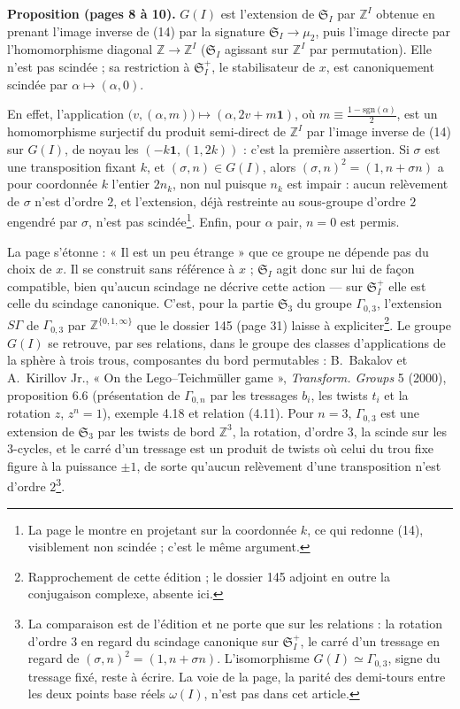 \documentclass[11pt,a4paper]{article}
\begin{document}
\textbf{Proposition (pages 8 à 10).} $G(I)$ est l'extension de
$\mathfrak{S}_I$ par $\mathbb{Z}^I$ obtenue en prenant l'image inverse de (14)
par la signature $\mathfrak{S}_I \to \mu_2$, puis l'image directe par
l'homomorphisme diagonal $\mathbb{Z} \to \mathbb{Z}^I$ ($\mathfrak{S}_I$
agissant sur $\mathbb{Z}^I$ par permutation). Elle n'est pas scindée ; sa
restriction à $\mathfrak{S}_I^{+}$, le stabilisateur de $x$, est canoniquement
scindée par $\alpha \mapsto (\alpha, 0)$.

En effet, l'application $\bigl(v, (\alpha, m)\bigr) \mapsto (\alpha, 2v +
m\mathbf{1})$, où $m \equiv \frac{1-\mathrm{sgn}(\alpha)}{2}$, est un
homomorphisme surjectif du produit semi-direct de $\mathbb{Z}^I$ par l'image
inverse de (14) sur $G(I)$, de noyau les $(-k\mathbf{1}, (1, 2k))$ : c'est la
première assertion. Si $\sigma$ est une transposition fixant $k$, et $(\sigma,
n) \in G(I)$, alors $(\sigma, n)^2 = (1, n + \sigma n)$ a pour coordonnée $k$
l'entier $2n_k$, non nul puisque $n_k$ est impair : aucun relèvement de
$\sigma$ n'est d'ordre $2$, et l'extension, déjà restreinte au sous-groupe
d'ordre $2$ engendré par $\sigma$, n'est pas scindée\footnote{La page le
montre en projetant sur la coordonnée $k$, ce qui redonne (14), visiblement non
scindée ; c'est le même argument.}. Enfin, pour $\alpha$ pair, $n = 0$ est
permis.

La page s'étonne : « Il est un peu étrange » que ce groupe ne dépende pas du
choix de $x$. Il se construit sans référence à $x$ ; $\mathfrak{S}_I$ agit
donc sur lui de façon compatible, bien qu'aucun scindage ne décrive cette
action — sur $\mathfrak{S}_I^{+}$ elle est celle du scindage canonique. C'est,
pour la partie $\mathfrak{S}_3$ du groupe $\Gamma_{0,3}$, l'extension
$S\Gamma$ de $\Gamma_{0,3}$ par $\mathbb{Z}^{\{0,1,\infty\}}$ que le dossier
145 (page 31) laisse à expliciter\footnote{Rapprochement de cette édition ;
le dossier 145 adjoint en outre la conjugaison complexe, absente ici.}. Le
groupe $G(I)$ se retrouve, par ses relations, dans le groupe des classes
d'applications de la sphère à trois trous, composantes du bord permutables :
B.~Bakalov et A.~Kirillov Jr., « On the Lego--Teichmüller game »,
\emph{Transform. Groups} 5 (2000), proposition 6.6 (présentation de
$\Gamma_{0,n}$ par les tressages $b_i$, les twists $t_i$ et la rotation $z$,
$z^n = 1$), exemple 4.18 et relation (4.11). Pour $n = 3$, $\Gamma_{0,3}$ est
une extension de $\mathfrak{S}_3$ par les twists de bord $\mathbb{Z}^3$, la
rotation, d'ordre $3$, la scinde sur les $3$-cycles, et le carré d'un tressage
est un produit de twists où celui du trou fixe figure à la puissance $\pm 1$,
de sorte qu'aucun relèvement d'une transposition n'est d'ordre $2$\footnote{La
comparaison est de l'édition et ne porte que sur les relations : la rotation
d'ordre $3$ en regard du scindage canonique sur $\mathfrak{S}_I^{+}$, le carré
d'un tressage en regard de $(\sigma, n)^2 = (1, n + \sigma n)$. L'isomorphisme
$G(I) \simeq \Gamma_{0,3}$, signe du tressage fixé, reste à écrire. La voie de
la page, la parité des demi-tours entre les deux points base réels
$\omega(I)$, n'est pas dans cet article.}.
\end{document}
